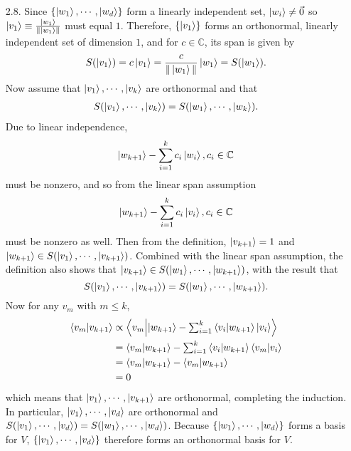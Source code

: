 \documentclass[a4paper,12pt]{article}
\begin{document}
\begin{enumerate}
	\item[2.8.] Since $\{ \ket{w_1}, \cdots, \ket{w_d} \}$ form a linearly independent set, $\ket{w_i} \neq \vec{0}$ so $\ket{v_1} \equiv \frac{\ket{w_1}}{\Vert \ket{w_1} \Vert}$ must equal $1$. Therefore, $\{ \ket{v_1} \}$ forms an orthonormal, linearly independent set of dimension $1$, and for $c \in \mathbb{C}$, its span is given by
	\[ S(\ket{v_1}) = c \ket{v_1} = \frac{c}{\Vert \ket{w_1} \Vert} \ket{w_1} = S(\ket{w_1}). \]
	Now assume that $\ket{v_1}, \cdots, \ket{v_k}$ are orthonormal and that
    \begin{align*}
        S(\ket{v_1}, \cdots, \ket{v_k}) = S(\ket{w_1}, \cdots, \ket{w_k}).
    \end{align*}
    Due to linear independence,
	\[ \ket{w_{k + 1}} - \sum_{i = 1}^{k} c_i \ket{w_i}, c_i \in \mathbb{C} \]
	must be nonzero, and so from the linear span assumption
	\[ \ket{w_{k + 1}} - \sum_{i = 1}^{k} c_i \ket{v_i}, c_i \in \mathbb{C} \]
	must be nonzero as well. Then from the definition, $\ket{v_{k + 1}} = 1$ and $\ket{w_{k + 1}} \in S(\ket{v_1}, \cdots, \ket{v_{k + 1}})$. Combined with the linear span assumption, the definition also shows that $\ket{v_{k + 1}} \in S(\ket{w_1}, \cdots, \ket{w_{k + 1}})$, with the result that
	\[ S(\ket{v_1}, \cdots, \ket{v_{k + 1}}) = S(\ket{w_1}, \cdots, \ket{w_{k + 1}}). \] Now for any $v_m$ with $m \leq k$,
	\begin{align*}
		\braket{v_m}{v_{k + 1}} &\propto \braket{v_m}{\ket{w_{k + 1}} - \textstyle{ \sum_{i = 1}^{k} \textstyle} \braket{v_i}{w_{k + 1}} \ket{v_i}} \\
		&= \braket{v_m}{w_{k + 1}} - \textstyle{ \sum_{i = 1}^{k} \textstyle} \braket{v_i}{w_{k + 1}} \braket{v_m}{v_i} \\
		&= \braket{v_m}{w_{k + 1}} - \braket{v_m}{w_{k + 1}} \\
		&= 0
	\end{align*}
	which means that $\ket{v_1}, \cdots, \ket{v_{k + 1}}$ are orthonormal, completing the induction. In particular, $\ket{v_1}, \cdots, \ket{v_d}$ are orthonormal and $S(\ket{v_1}, \cdots, \ket{v_d}) \\ = S(\ket{w_1}, \cdots, \ket{w_d})$. Because $\{ \ket{w_1}, \cdots, \ket{w_d} \}$ forms a basis for $V$, $\{ \ket{v_1}, \cdots, \ket{v_d} \}$ therefore forms an orthonormal basis for $V$.
	

\end{enumerate}
\end{document}
